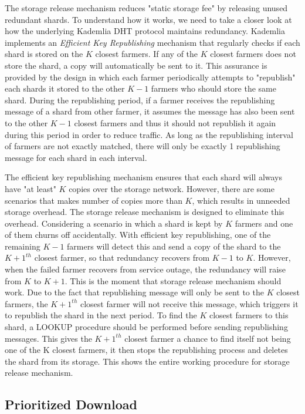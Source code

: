 The storage release mechanism reduces "static storage fee" by releasing unused redundant shards. To understand how it works, we need to take a closer look at how the underlying Kademlia DHT protocol maintains redundancy. Kademlia implements an \textit{Efficient Key Republishing} mechanism that regularly checks if each shard is stored on the $K$ closest farmers.\cite{maymounkov2002kademlia} If any of the $K$ closest farmers does not store the shard, a copy will automatically be sent to it. This assurance is provided by the design in which each farmer periodically attempts to "republish" each shards it stored to the other $K-1$ farmers who should store the same shard. During the republishing period, if a farmer receives the republishing message of a shard from other farmer, it assumes the message has also been sent to the other $K-1$ closest farmers and thus it should not republish it again during this period in order to reduce traffic. As long as the republishing interval of farmers are not exactly matched, there will only be exactly 1 republishing message for each shard in each interval.

The efficient key republishing mechanism ensures that each shard will always have "at least" $K$ copies over the storage network. However, there are some scenarios that makes number of copies more than $K$, which results in unneeded storage overhead. The storage release mechanism is designed to eliminate this overhead. Considering a scenario in which a shard is kept by $K$ farmers and one of them churns off accidentally. With efficient key republishing, one of the remaining $K-1$
farmers will detect this and send a copy of the shard to the $K+1^{th}$ closest farmer, so that redundancy recovers from $K-1$ to $K$. However, when the failed farmer recovers from service outage, the redundancy will raise from $K$ to $K+1$. This is the moment that storage release mechanism should work. Due to the fact that republishing message will only be sent to the $K$ closest farmers, the $K+1^{th}$ closest farmer will not receive this message, which triggers it to republish the shard in the next period. To find the $K$ closest farmers to this shard, a LOOKUP procedure should be performed before sending republishing messages. This gives the $K+1^{th}$ closest farmer a chance to find itself not being one of the K closest farmers, it then stops the republishing process and deletes the shard from its storage. This shows the entire working procedure for storage release mechanism.

\subsection{Prioritized Download}
\label{ss:prioritizeddownload}

